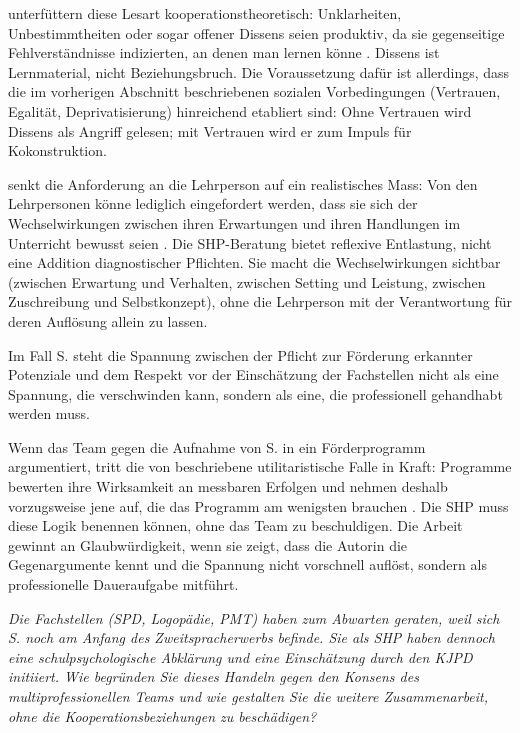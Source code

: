 \documentclass[ngerman, a4paper]{article}
\begin{document}
\textcite[S.\,471]{groschefussangelgraesel2020kokonstruktion} unterfüttern diese
Lesart kooperationstheoretisch: Unklarheiten, Unbestimmtheiten oder sogar offener
Dissens seien produktiv, da sie gegenseitige Fehlverständnisse indizierten, an
denen man lernen könne
\parencite[vgl.][S.\,471]{groschefussangelgraesel2020kokonstruktion}. Dissens ist
Lernmaterial, nicht Beziehungsbruch. Die Voraussetzung dafür ist allerdings, dass
die im vorherigen Abschnitt beschriebenen sozialen Vorbedingungen (Vertrauen,
Egalität, Deprivatisierung) hinreichend etabliert sind: Ohne Vertrauen wird Dissens
als Angriff gelesen; mit Vertrauen wird er zum Impuls für Kokonstruktion.

\textcite[S.\,424]{wagener2021bfhemmendfoerdernd} senkt die Anforderung
an die Lehrperson auf ein realistisches Mass: Von den Lehrpersonen könne
lediglich eingefordert werden, dass sie sich der Wechselwirkungen zwischen ihren
Erwartungen und ihren Handlungen im Unterricht bewusst seien
\parencite[vgl.][S.\,424]{wagener2021bfhemmendfoerdernd}. Die SHP-Beratung
bietet reflexive Entlastung, nicht eine Addition diagnostischer Pflichten. Sie
macht die Wechselwirkungen sichtbar (zwischen Erwartung und Verhalten, zwischen
Setting und Leistung, zwischen Zuschreibung und Selbstkonzept), ohne die
Lehrperson mit der Verantwortung für deren Auflösung allein zu lassen.

Im
Fall S. steht die Spannung zwischen der Pflicht zur Förderung erkannter Potenziale
und dem Respekt vor der Einschätzung der Fachstellen nicht als eine Spannung,
die verschwinden kann, sondern als eine, die professionell gehandhabt werden muss.

Wenn das Team gegen die Aufnahme von S. in ein Förderprogramm argumentiert,
tritt die von \textcite[S.\,71\psq]{sedmak2021bildungsgerechtigkeit} beschriebene
utilitaristische Falle in Kraft: Programme bewerten ihre Wirksamkeit an
messbaren Erfolgen und nehmen deshalb vorzugsweise jene auf, die das Programm am
wenigsten brauchen \parencite[vgl.][S.\,71\psq]{sedmak2021bildungsgerechtigkeit}.
Die SHP muss diese Logik benennen können, ohne das Team zu beschuldigen. Die Arbeit
gewinnt an Glaubwürdigkeit, wenn sie zeigt, dass die Autorin die Gegenargumente
kennt und die Spannung nicht vorschnell auflöst, sondern als professionelle
Daueraufgabe mitführt.

\begin{tcolorbox}[colback=gray!5, colframe=gray!50, title=Weiterführende Diskurslinie]
  \itshape
  Die Fachstellen (SPD, Logopädie, PMT) haben zum Abwarten geraten, weil sich S.
  noch am Anfang des Zweitspracherwerbs befinde. Sie als SHP haben dennoch eine
  schulpsychologische Abklärung und eine Einschätzung durch den KJPD initiiert.
  Wie begründen Sie dieses Handeln gegen den Konsens des multiprofessionellen
  Teams und wie gestalten Sie die weitere Zusammenarbeit, ohne die
  Kooperationsbeziehungen zu beschädigen?
\end{tcolorbox}
\end{document}
